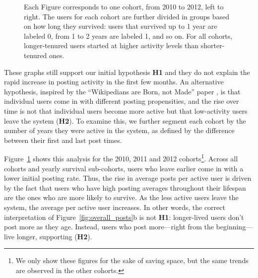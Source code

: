 \begin{figure}[!tb]
\centering
{}
\caption{Each Figure corresponds to one cohort, from 2010 to 2012, left to right. The users for each cohort are further divided in groups based on how long they survived: users that survived up to 1 year are labeled 0, from 1 to 2 years are labeled 1, and so on.  For all cohorts, longer-tenured users started at higher activity levels than shorter-tenured ones.}
\label{fig:avr_posts_per_user_for_surviving_year}
\end{figure}

These graphs still support our initial hypothesis \textbf{H1} 
and they do not explain the rapid increase in posting activity in the first few months.  An alternative hypothesis, inspired by the ``Wikipedians are Born, not Made'' paper \cite{Panciera2009}, is that individual users come in with different posting propensities, and the rise over time is not that individual users become more active but that low-activity users leave the system (\textbf{H2}).  To examine this, we further segment each cohort by the number of years they were active in the system, as defined by the difference between their first and last post times.
 
Figure~\ref{fig:avr_posts_per_user_for_surviving_year} shows this analysis for the 2010, 2011 and 2012 cohorts\footnote{We only show these figures for the sake of saving space, but the same trends are observed in the other cohorts.}.  Across all cohorts and yearly survival sub-cohorts, users who leave earlier come in with a lower initial posting rate.  Thus, the rise in average posts per active user is driven by the fact that users who have high posting averages throughout their lifespan are the ones who are more likely to survive.  As the less active users leave the system, the average per active user increases.  In other words, the correct interpretation of Figure~\ref{fig:overall_posts}b is not \textbf{H1}: longer-lived users don't post more as they age.  Instead, users who post more---right from the beginning---live longer, supporting (\textbf{H2}). 

